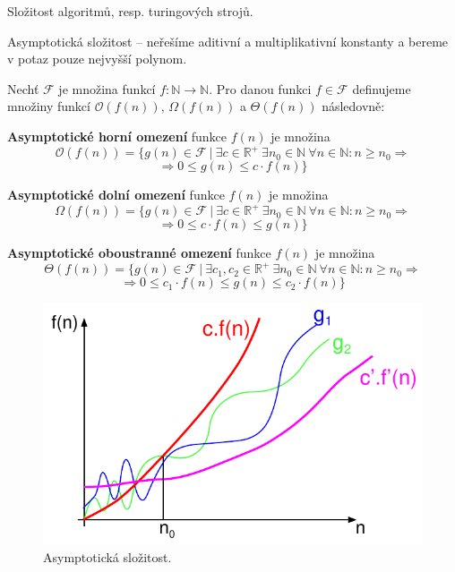\begin{compactitem}
    \item Složitost algoritmů, resp. turingových strojů.

    \item Asymptotická složitost -- neřešíme aditivní a multiplikativní konstanty a bereme v potaz pouze nejvyšší polynom.

    \item Nechť $\mathcal{F}$ je množina funkcí $f : \mathbb{N} \rightarrow \mathbb{N}$. Pro danou funkci $f \in \mathcal{F}$ definujeme množiny funkcí $\mathcal{O}(f(n))$, $\Omega(f(n))$ a $\Theta(f(n))$ následovně: \begin{compactitem}

        \item \textbf{Asymptotické horní omezení} funkce $f(n)$ je množina
        $$ \mathcal{O}(f(n)) = \{ g(n) \in \mathcal{F} ~|~ \exists c \in \mathbb{R}^{+} ~\exists n_0 \in \mathbb{N} ~\forall n \in \mathbb{N} : n \geq n_0 \Rightarrow $$
        $$ \Rightarrow 0 \leq g(n) \leq c \cdot f(n) \} $$

        \item \textbf{Asymptotické dolní omezení} funkce $f(n)$ je množina
        $$ \Omega(f(n)) = \{ g(n) \in \mathcal{F} ~|~ \exists c \in \mathbb{R}^{+} ~\exists n_0 \in \mathbb{N} ~\forall n \in \mathbb{N} : n \geq n_0 \Rightarrow $$
        $$ \Rightarrow 0 \leq c \cdot f(n) \leq g(n) \} $$

        \item \textbf{Asymptotické oboustranné omezení} funkce $f(n)$ je množina
        $$ \Theta(f(n)) = \{ g(n) \in \mathcal{F} ~|~ \exists c_1, c_2 \in \mathbb{R}^{+} ~\exists n_0 \in \mathbb{N} ~\forall n \in \mathbb{N} : n \geq n_0 \Rightarrow $$
        $$ \Rightarrow 0 \leq c_1 \cdot f(n) \leq g(n) \leq c_2 \cdot f(n) \} $$

    \end{compactitem}
\end{compactitem}

\begin{figure}[H]
    \centering
    \includegraphics[width=0.75\linewidth]{complexity.pdf}
    \caption{Asymptotická složitost.}
\end{figure}

